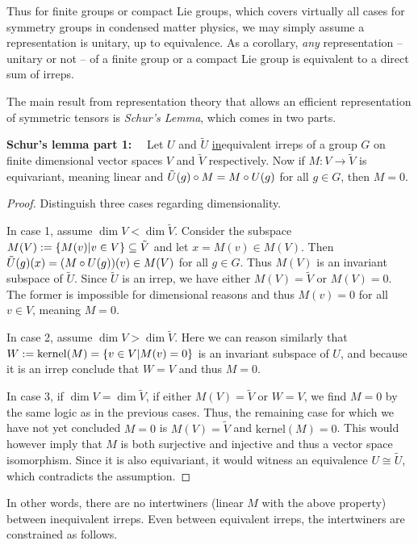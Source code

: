 Thus for finite groups or compact Lie groups, which covers virtually all cases for symmetry groups in condensed matter physics, we may simply assume a representation is unitary, up to equivalence.
%
As a corollary, \emph{any} representation -- unitary or not -- of a finite group or a compact Lie group is equivalent to a direct sum of irreps.

The main result from representation theory that allows an efficient representation of symmetric tensors is \emph{Schur's Lemma}, which comes in two parts.

\textbf{Schur's lemma part 1:}~~
Let $U$ and $\tilde{U}$ \underline{in}equivalent irreps of a group $G$ on finite dimensional vector spaces $V$ and $\tilde{V}$ respectively.
%
Now if $M : V \to \tilde{V}$ is equivariant, meaning linear and $\tilde{U}(g) \circ M = M \circ U(g)$ for all $g\in G$, then $M=0$.

\begin{proof}
    Distinguish three cases regarding dimensionality.

    In case 1, assume $\dim V < \dim \tilde{V}$. Consider the subspace $M(V) := \setdef{M(v)}{v\in V} \subseteq \tilde{V}$ and let $x = M(v) \in M(V)$.
    Then $\tilde{U}(g)(x) = (M \circ U(g))(v) \in M(V)$ for all $g\in G$.
    Thus $M(V)$ is an invariant subspace of $\tilde{U}$.
    Since $\tilde{U}$ is an irrep, we have either $M(V) = \tilde{V}$ or $M(V) = 0$.
    The former is impossible for dimensional reasons and thus $M(v) = 0$ for all $v\in V$, meaning $M=0$.

    In case 2, assume $\dim V > \dim \tilde{V}$.
    Here we can reason similarly that $W := \mathrm{kernel}(M) = \setdef{v \in V}{M(v) = 0}$ is an invariant subspace of $U$, and because it is an irrep conclude that $W=V$ and thus $M=0$.

    In case 3, if $\dim V = \dim \tilde{V}$, if either $M(V) = \tilde{V}$ or $W = V$, we find $M=0$ by the same logic as in the previous cases.
    Thus, the remaining case for which we have not yet concluded $M=0$ is $M(V) = \tilde{V}$ and $\mathrm{kernel}(M) = 0$. This would however imply that $M$ is both surjective and injective and thus a vector space isomorphism. Since it is also equivariant, it would witness an equivalence $U \cong \tilde{U}$, which contradicts the assumption.
\end{proof}

In other words, there are no intertwiners (linear $M$ with the above property) between inequivalent irreps.
%
Even between equivalent irreps, the intertwiners are constrained as follows.

